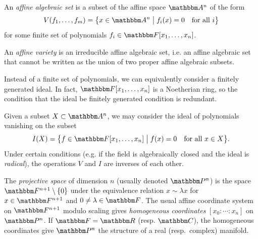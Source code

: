 \documentclass[11pt,titlepage]{article}
\newcommand*{\vbar}{\;\big\vert\;}
\numberwithin{equation}{section}
\begin{document}
    \begin{definition}
        An \emph{affine algebraic set} is a subset of the affine space $\A^n$
        of the form
        \[
            V(f_1, \ldots, f_m)
            = \cdil[\big]{x \in \A^n \vbar f_i(x) = 0 \quad\text{for all $i$}}
        \]
        for some finite set of polynomials $f_i \in \F[x_1, \ldots, x_n]$.

        An \emph{affine variety} is an irreducible affine algebraic set, i.e. an
        affine algebraic set that cannot be written as the union of two proper
        affine algebraic subsets.
    \end{definition}
    \noindent Instead of a finite set of polynomials, we can equivalently
    consider a finitely generated ideal.  In fact, $\F[x_1,\ldots,x_n]$ is a
    Noetherian ring, so the condition that the ideal be finitely generated
    condition is redundant.

    Given a subset $X \subset \A^n$, we may consider the ideal of polynomials
    vanishing on the subset
    \[
        I(X) = \cdil[\big]{f \in \F[x_1, \ldots, x_n] \vbar f(x) = 0 \quad\text{for
        all $x \in X$}}.
    \]
    Under certain conditions (e.g. if the field is algebraically closed and the
    ideal is \emph{radical}), the operations $V$ and $I$ are inverses of each other.

    \begin{definition}
        The \emph{projective space} of dimension $n$ (usually denoted $\Proj^n$)
        is the space $\F^{n+1}\setminus \{0\}$ under the equivalence relation $x
        \sim \lambda x$ for $x \in \F^{n+1}$ and $0 \ne \lambda \in \F$.  The
        usual affine coordinate system on $\F^{n+1}$ modulo scaling gives
        \emph{homogeneous coordinates} $[x_0: \cdots: x_n]$ on $\Proj^n$.  If
        $\F = \R$ (resp.  $\C$), the homogeneous coordinates give $\Proj^n$ the
        structure of a real (resp.\ complex) manifold.
    \end{definition}
\end{document}
